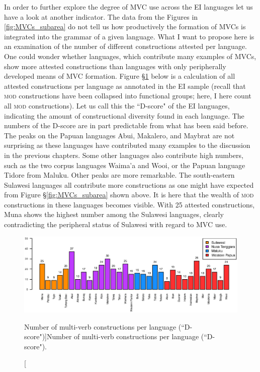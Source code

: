 In order to further explore the degree of MVC use across the EI languages let us have a look at another indicator. The data from the Figures in \ref{fig:MVCs_subarea} do not tell us how productively the formation of MVCs is integrated into the grammar of a given language. What I want to propose here is an examination of the number of different constructions attested per language. One could wonder whether languages, which contribute many examples of MVCs, show more attested constructions than languages with only peripherally developed means of MVC formation. Figure §\ref{fig:number_types} below is a calculation of all attested constructions per language as annotated in the EI sample (recall that \textsc{mod} constructions have been collapsed into functional groups; here, I here count all \textsc{mod} constructions). Let us call this the ``D-score" of the EI languages, indicating the amount of constructional diversity found in each language. The numbers of the D-score are in part predictable from what has been said before. The peaks on the Papuan languages Abui, Makalero, and Maybrat are not surprising as these languages have contributed many examples to the discussion in the previous chapters. Some other languages also contribute high numbers, such as the two corpus languages Waima'a and Wooi, or the Papuan language Tidore from Maluku. Other peaks are more remarkable. The south-eastern Sulawesi languages all contribute more constructions as one might have expected from Figure §\ref{fig:MVCs_subarea} shown above. It is here that the wealth of \textsc{mod} constructions in these languages becomes visible. With 25 attested constructions, Muna shows the highest number among the Sulawesi languages, clearly contradicting the peripheral status of Sulawesi with regard to MVC use.

\begin{figure}
\includegraphics[width=\columnwidth]{figures/MVCs_languages_clean.eps}
\caption[Number of multi-verb constructions per language (``D-score")]{Number of multi-verb constructions per language (``D-score").}\label{fig:number_types}
\end{figure}

